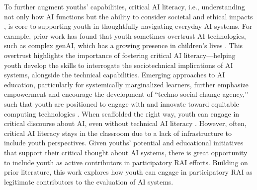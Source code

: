To further augment youths’ capabilities, critical AI literacy, i.e., understanding not only how AI functions but the ability to consider societal and ethical impacts \cite{wang2023treat, wolfe2024representation, solyst2023would}, is core to supporting youth in thoughtfully navigating everyday AI systems. For example, prior work has found that youth sometimes overtrust AI technologies, such as complex genAI, which has a growing presence in children’s lives \cite{solyst2024children}. This overtrust highlights the importance of fostering critical AI literacy—helping youth develop the skills to interrogate the sociotechnical implications of AI systems, alongside the technical capabilities. Emerging approaches to AI education, particularly for systemically marginalized learners, further emphasize empowerment and encourage the development of ``techno-social change agency,’’ such that youth are positioned to engage with and innovate toward equitable computing technologies \cite{scott2015culturally, coenraad2022s, dangol2024mediating, scott2016techno, li2023want, solyst2023would}.
When scaffolded the right way, youth can engage in critical discourse about AI, even without technical AI literacy \cite{solyst2025RAD}. However, often, critical AI literacy stays in the classroom due to a lack of infrastructure to include youth perspectives. Given youths’ potential and educational initiatives that support their critical thought about AI systems, there is great opportunity to include youth as active contributors in participatory RAI efforts. Building on prior literature, this work explores how youth can engage in participatory RAI as legitimate contributors to the evaluation of AI systems.

